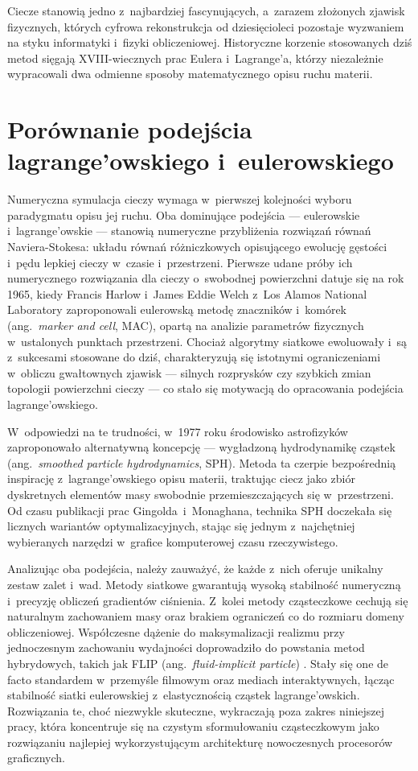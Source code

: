 Ciecze stanowią jedno z~najbardziej fascynujących, a~zarazem złożonych zjawisk fizycznych, 
których cyfrowa rekonstrukcja od dziesięcioleci pozostaje wyzwaniem na styku informatyki
i~fizyki obliczeniowej. Historyczne korzenie stosowanych dziś metod sięgają XVIII-wiecznych prac 
Eulera i~Lagrange'a, którzy niezależnie wypracowali dwa odmienne sposoby matematycznego opisu ruchu materii.

\section{Porównanie podejścia lagrange'owskiego i~eulerowskiego}

Numeryczna symulacja cieczy wymaga w~pierwszej kolejności wyboru paradygmatu opisu jej ruchu. 
Oba dominujące podejścia --- eulerowskie i~lagrange'owskie --- stanowią numeryczne przybliżenia 
rozwiązań równań Naviera-Stokesa: układu równań różniczkowych opisującego ewolucję gęstości i~pędu 
lepkiej cieczy w~czasie i~przestrzeni. Pierwsze udane próby ich numerycznego rozwiązania dla cieczy
o~swobodnej powierzchni datuje się na rok 1965, kiedy Francis Harlow i~James Eddie Welch z~Los Alamos National Laboratory 
zaproponowali eulerowską metodę znaczników i~komórek (ang.~\textit{marker and cell}, MAC)\cite{harlow1965numerical}, 
opartą na analizie parametrów fizycznych w~ustalonych punktach przestrzeni. Chociaż algorytmy siatkowe 
ewoluowały i~są z~sukcesami stosowane do dziś, charakteryzują się istotnymi ograniczeniami w~obliczu 
gwałtownych zjawisk --- silnych rozprysków czy szybkich zmian topologii powierzchni cieczy --- co stało się 
motywacją do opracowania podejścia lagrange'owskiego.

W~odpowiedzi na te trudności, w~1977 roku środowisko astrofizyków zaproponowało alternatywną koncepcję 
--- wygładzoną hydrodynamikę cząstek (ang.~\textit{smoothed particle hydrodynamics}, SPH)\cite{gingold1977smoothed}. 
Metoda ta czerpie bezpośrednią inspirację z~lagrange'owskiego opisu materii, traktując ciecz jako 
zbiór dyskretnych elementów masy swobodnie przemieszczających się w~przestrzeni. Od czasu publikacji 
prac Gingolda~i~Monaghana, technika SPH doczekała się licznych wariantów optymalizacyjnych, stając się 
jednym z~najchętniej wybieranych narzędzi w~grafice komputerowej czasu rzeczywistego.

Analizując oba podejścia, należy zauważyć, że każde z~nich oferuje unikalny zestaw zalet i~wad. 
Metody siatkowe gwarantują wysoką stabilność numeryczną i~precyzję obliczeń gradientów ciśnienia. 
Z~kolei metody cząsteczkowe cechują się naturalnym zachowaniem masy oraz brakiem ograniczeń co do 
rozmiaru domeny obliczeniowej. Współczesne dążenie do maksymalizacji realizmu przy jednoczesnym zachowaniu 
wydajności doprowadziło do powstania metod hybrydowych, takich jak FLIP (ang.~\textit{fluid-implicit particle}) 
\cite{brackbill1986flip}. Stały się one de facto standardem w~przemyśle filmowym oraz mediach interaktywnych, 
łącząc stabilność siatki eulerowskiej z~elastycznością cząstek lagrange'owskich. Rozwiązania te,
choć niezwykle skuteczne, wykraczają poza zakres niniejszej pracy, która koncentruje się na czystym
sformułowaniu cząsteczkowym jako rozwiązaniu najlepiej wykorzystującym architekturę nowoczesnych procesorów graficznych.

